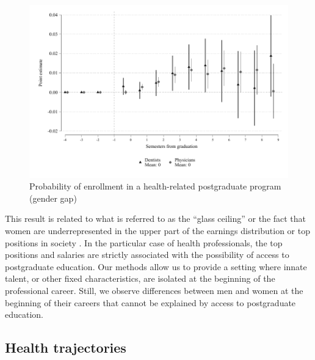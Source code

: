\documentclass[12pt, a4paper]{article}
\begin{document}
\begin{figure}[H]
\caption{Probability of enrollment in a health-related postgraduate program (gender gap)}\label{fig:postgrad_gap}
\centering 
\includegraphics[width=\textwidth]{Figures/Callaway SantAnna/ES_posgrado_salud_gap.pdf}
\end{figure}

This result is related to what is referred to as the “glass ceiling” or the fact that women are underrepresented in the upper part of the earnings distribution or top positions in society \citep{goldin2014grand}. In the particular case of health professionals, the top positions and salaries are strictly associated with the possibility of access to postgraduate education. Our methods allow us to provide a setting where innate talent, or other fixed characteristics, are isolated at the beginning of the professional career. Still, we observe differences between men and women at the beginning of their careers that cannot be explained by access to postgraduate education. 

\subsection{Health trajectories \label{sec:rips}}
\end{document}

